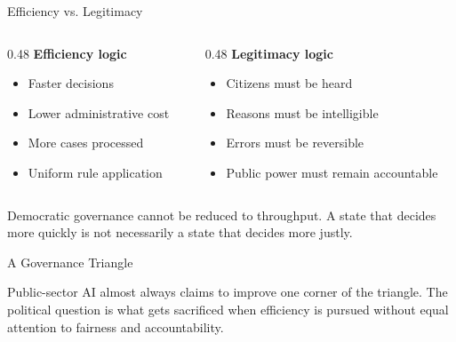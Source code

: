 \documentclass[aspectratio=169,11pt]{beamer}
\begin{document}
\begin{frame}{Efficiency vs. Legitimacy}
\begin{columns}[T]
\begin{column}{0.48\textwidth}
\textbf{Efficiency logic}
\begin{itemize}
    \item Faster decisions
    \item Lower administrative cost
    \item More cases processed
    \item Uniform rule application
\end{itemize}
\end{column}
\begin{column}{0.48\textwidth}
\textbf{Legitimacy logic}
\begin{itemize}
    \item Citizens must be heard
    \item Reasons must be intelligible
    \item Errors must be reversible
    \item Public power must remain accountable
\end{itemize}
\end{column}
\end{columns}

\vspace{0.2cm}
Democratic governance cannot be reduced to throughput. A state that decides more quickly is not necessarily a state that decides more justly.
\end{frame}

\begin{frame}{A Governance Triangle}
\begin{center}
\end{center}

\vspace{0.2cm}
Public-sector AI almost always claims to improve one corner of the triangle. The political question is what gets sacrificed when efficiency is pursued without equal attention to fairness and accountability.
\end{frame}
\end{document}
